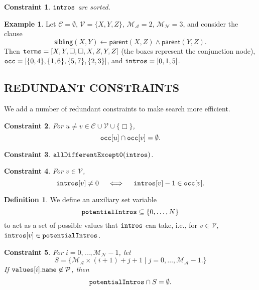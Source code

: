 \documentclass[letterpaper]{article}
\newtheorem{constraint}{Constraint}
\theoremstyle{definition}
\newtheorem{definition}{Definition}
\newtheorem{example}{Example}
\newcommand{\variable}[1]{\texttt{\textup{#1}}}
\newcommand{\predicates}{\mathcal{P}}
\newcommand{\variables}{\mathcal{V}}
\newcommand{\constants}{\mathcal{C}}
\newcommand{\maxArity}{\mathcal{M}_{\mathcal{A}}}
\newcommand{\maxNumNodes}{\mathcal{M}_{\mathcal{N}}}
\begin{document}
\begin{constraint}
  $\variable{intros}$ are sorted.
\end{constraint}

\begin{example} \label{example:sibling}
  Let $\constants{} = \emptyset$, $\variables{} = \{ X, Y, Z \}$, $\maxArity{} =
  2$, $\maxNumNodes{} = 3$, and consider the clause
  \[
    \mathsf{sibling}(X, Y) \gets \mathsf{parent}(X, Z) \land
    \mathsf{parent}(Y, Z).
  \]
  Then $\variable{terms} = [X, Y, \Box, \Box, X, Z, Y, Z]$ (the boxes represent
  the conjunction node), $\variable{occ} = [\{ 0, 4 \}, \{ 1, 6 \},
  \{ 5, 7 \}, \{ 2, 3 \}]$, and $\variable{intros} = [0, 1, 5]$.
\end{example}

\subsection{REDUNDANT CONSTRAINTS}

We add a number of redundant constraints to make search more efficient.

\begin{constraint}
  For $u \ne v \in \constants{} \cup \variables{} \cup \{ \Box \}$,
  \[
    \variable{occ}[u] \cap \variable{occ}[v] = \emptyset.
  \]
\end{constraint}

\begin{constraint} \label{constraint:diffbutzero}
  $\variable{allDifferentExcept0}(\variable{intros})$.
\end{constraint}

\begin{constraint}
  For $v \in \variables{}$,
  \[
    \variable{intros}[v] \ne 0 \quad \iff \quad
    \variable{intros}[v] - 1 \in \variable{occ}[v].
  \]
\end{constraint}

\begin{definition}
  We define an auxiliary set variable
  \[
    \variable{potentialIntros} \subseteq \{ 0, \dots, N \}
  \]
  to act as a set of possible values that $\variable{intros}$ can take,
  i.e., for $v \in \variables{}$, $\variable{intros}[v] \in
  \variable{potentialIntros}$.
\end{definition}

\begin{constraint} \label{constraint:potentialIntroductions}
  For $i = 0, \dots, \maxNumNodes{} - 1$, let
  \[
    S = \{ \maxArity{} \times (i + 1) + j + 1 \mid j = 0, \dots, \maxArity{} - 1.
    \}
  \]
  If $\variable{values}[i].\variable{name} \not\in \predicates{}$, then
  \[
    \variable{potentialIntros} \cap S = \emptyset.
  \]
\end{constraint}
\end{document}
